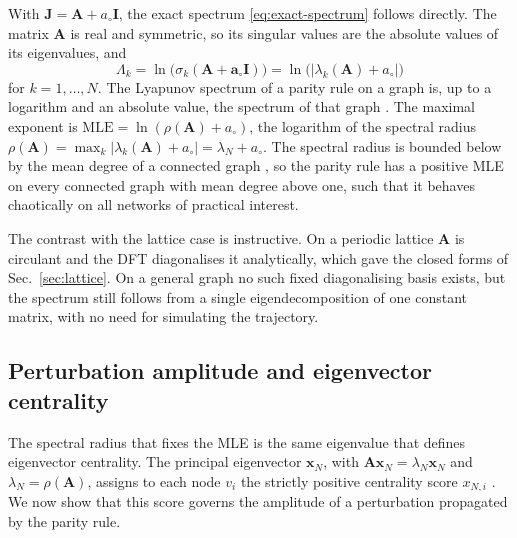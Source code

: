 \documentclass[a4paper,fleqn]{cas-dc}
\begin{document}
With $\mathbf{J}=\mathbf{A} + a_\circ\mathbf{I}$, the exact spectrum \eqref{eq:exact-spectrum}
follows directly. The matrix $\mathbf{A}$ is real and symmetric, so its singular
values are the absolute values of its eigenvalues, and
\begin{equation}
    \label{eq:network-spectrum}
    \Lambda_k=\ln\bigl(\sigma_k(\mathbf{A + a_\circ\mathbf{I}})\bigr)
    =\ln\bigl(\lvert\lambda_k(\mathbf{A})+ a_\circ\rvert\bigr)
\end{equation}
for $k=1,\dots,N$. The Lyapunov spectrum of a parity rule on a graph is, up to a logarithm and an absolute value, the spectrum of that graph \cite{vanmieghem2011graph}. The maximal exponent is $\mathrm{MLE}=\ln(\rho(\mathbf{A})+a_\circ)$, the logarithm of the spectral radius $\rho(\mathbf{A})=\max_k\lvert\lambda_k(\mathbf{A})+a_\circ\rvert = \lambda_N+a_\circ$. The spectral radius is bounded below by the mean degree of a connected graph \cite{hong1993bounds}, so the parity rule has a positive MLE on every connected graph with mean degree above one, such that it behaves chaotically on all networks of practical interest.

The contrast with the lattice case is instructive. On a periodic lattice $\mathbf{A}$ is circulant and the DFT diagonalises it analytically, which gave the closed forms of Sec.~\ref{sec:lattice}. On a general graph no such fixed diagonalising basis exists, but the spectrum still follows from a single eigendecomposition of one constant matrix, with no need for simulating the trajectory.

\subsection{Perturbation amplitude and eigenvector centrality}

The spectral radius that fixes the MLE is the same eigenvalue that defines eigenvector centrality. The principal eigenvector $\mathbf{x}_N$, with $\mathbf{A}\mathbf{x}_N=\lambda_N\mathbf{x}_N$ and $\lambda_N=\rho(\mathbf{A})$, assigns to each node $v_i$ the strictly positive centrality score $x_{N,i}$ \cite{bonacich1987power}. We now show that this score governs the amplitude of a perturbation propagated by the parity rule.
\end{document}
